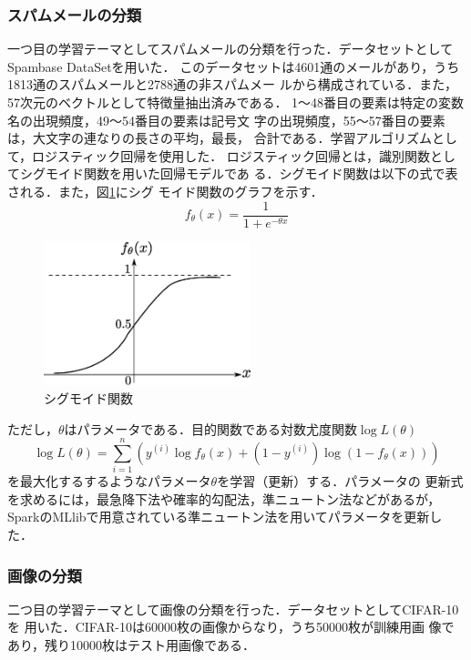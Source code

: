 \documentclass[a4paper,12pt]{jarticle}
\begin{document}
\subsubsection{スパムメールの分類}
一つ目の学習テーマとしてスパムメールの分類を行った．データセットとして
Spambase DataSet\cite{Spam}を用いた．
このデータセットは4601通のメールがあり，うち1813通のスパムメールと2788通の非スパムメー
ルから構成されている．また，57次元のベクトルとして特徴量抽出済みである．
1〜48番目の要素は特定の変数名の出現頻度，49〜54番目の要素は記号文
字の出現頻度，55〜57番目の要素は，大文字の連なりの長さの平均，最長，
合計である．学習アルゴリズムとして，ロジスティック回帰を使用した．
ロジスティック回帰とは，識別関数としてシグモイド関数を用いた回帰モデルであ
る．シグモイド関数は以下の式で表される．また，図\ref{fig:sigmoid}にシグ
モイド関数のグラフを示す．
%
\begin{equation}
 f_\theta (x) = \frac{1}{1+e^{-\theta x}}
\end{equation}
%
\begin{figure}[htbp]
 \begin{center}
  \includegraphics[width=60mm]{fig/sigmoid.eps}
  \caption{シグモイド関数}
  \label{fig:sigmoid}
 \end{center}
\end{figure}
%
ただし，$\theta$はパラメータである．目的関数である対数尤度関数$\log L(\theta)$
%
\begin{equation}
 \log L(\theta) = \sum^n_{i=1}(y^{(i)}\log f_\theta(x)+(1-y^{(i)})\log
  (1-f_\theta (x)))
\end{equation}
%
を最大化するするようなパラメータ$\theta$を学習（更新）する．パラメータの
更新式を求めるには，最急降下法や確率的勾配法，準ニュートン法などがあるが，
SparkのMLlibで用意されている準ニュートン法を用いてパラメータを更新した．


\subsubsection{画像の分類}
二つ目の学習テーマとして画像の分類を行った．データセットとしてCIFAR-10\cite{CIFAR}を
用いた．CIFAR-10は60000枚の画像からなり，うち50000枚が訓練用画
像であり，残り10000枚はテスト用画像である．
\end{document}
